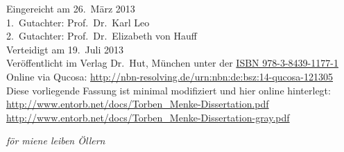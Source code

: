 \begin{titlepage}

\end{titlepage}
%
\vspace*{\fill}
Eingereicht am 26.\ März 2013
\vspace*{0.5em}\\1.\ Gutachter: Prof.\ Dr.\ Karl Leo
\vspace*{0.5em}\\2.\ Gutachter: Prof.\ Dr.\ Elizabeth von Hauff
\vspace*{0.5em}\\Verteidigt am 19.\ Juli 2013
\vspace*{1.5em}\\Veröffentlicht im Verlag Dr.\ Hut, München unter der
 \href{http://www.dr.hut-verlag.de/9783843911771.html}{ISBN 978-3-8439-1177-1}
\vspace*{0.5em}\\Online via Qucosa: \url{http://nbn-resolving.de/urn:nbn:de:bsz:14-qucosa-121305}
\vspace*{0.5em}\\Diese vorliegende Fassung ist minimal modifiziert und hier online hinterlegt:
\\\url{http://www.entorb.net/docs/Torben_Menke-Dissertation.pdf}
\\\url{http://www.entorb.net/docs/Torben_Menke-Dissertation-gray.pdf}
\newpage
\vspace*{5cm}
\begin{center}
\textit{för miene leiben Öllern}
\end{center}
\newpage
